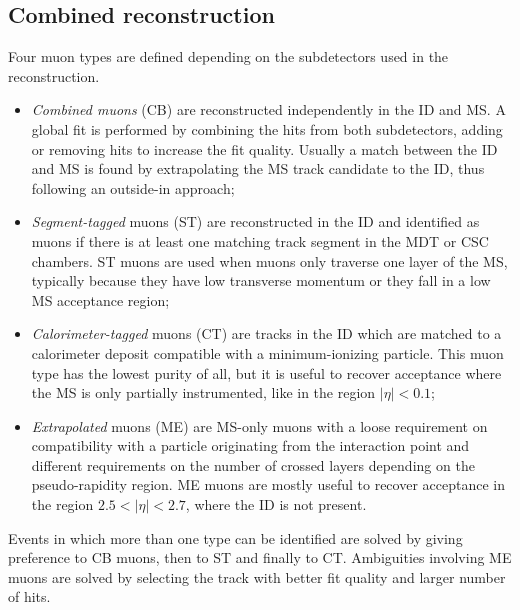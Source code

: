 \documentclass[a4paper,twoside,12pt]{book}
\begin{document}
\subsection*{Combined reconstruction}
Four muon types are defined depending on the subdetectors used in the reconstruction.\\

\begin{itemize}
\item \textit{Combined muons} (CB) are reconstructed independently in the ID and MS.
A global fit is performed by combining the hits from both subdetectors, adding or removing
hits to increase the fit quality. Usually a match between the ID and MS is found by 
extrapolating the MS track candidate to the ID, thus following an outside-in approach;

\item \textit{Segment-tagged} muons (ST) are reconstructed in the ID and identified
as muons if there is at least one matching track segment in the MDT or CSC chambers. ST
muons are used when muons only traverse one layer of the MS, typically because they
have low transverse momentum or they fall in a low MS acceptance region;

\item \textit{Calorimeter-tagged} muons (CT) are tracks in the ID which are matched to
a calorimeter deposit compatible with a minimum-ionizing particle. This muon type has
the lowest purity of all, but it is useful to recover acceptance where the MS is only 
partially instrumented, like in the region $|\eta|  < 0.1$;

\item \textit{Extrapolated} muons (ME) are MS-only muons with a loose requirement
on compatibility with a particle originating from the interaction point and different
requirements on the number of crossed layers depending on the pseudo-rapidity region.
ME muons are mostly useful to recover acceptance in the region $2.5 < |\eta| < 2.7$, where
the ID is not present. 
\end{itemize}

Events in which more than one type can be identified are solved by giving preference
to CB muons, then to ST and finally to CT. Ambiguities involving ME muons are solved
by selecting the track with better fit quality and larger number of hits.
\end{document}
